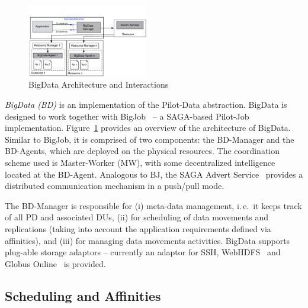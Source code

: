 \documentclass{acm_proc_article-sp}
\newcommand{\jhanote}[1]{ {\textcolor{red} { ***SJ: #1 }}}
\newcommand{\alnote}[1]{ {\textcolor{blue} { ***andreL: #1 }}}
\newcommand{\alnote}[1]{}
\newcommand{\jhanote}[1]{}
\newcommand{\upp}{\vspace*{-0.5em}}
\newcommand{\dus}{DUs\xspace}
\newcommand{\pd}{PD\xspace}
\begin{document}
\begin{figure}[htbp]
	\centering
		\includegraphics[width=0.47\textwidth]{figures/bigdata.pdf}
	\caption{BigData Architecture and Interactions\upp}
	\label{fig:figures_bigdata}
\end{figure}

{\it BigData (BD)} is an implementation of the Pilot-Data
abstraction. BigData is designed to work together with
BigJob~\cite{bigjob_web} -- a SAGA-based Pilot-Job implementation.
Figure~\ref{fig:figures_bigdata} provides an overview of the
architecture of BigData. Similar to BigJob, it is comprised of two
components: the BD-Manager and the BD-Agents, which are deployed on
the physical resources.  The coordination scheme used is Master-Worker
(MW), with some decentralized intelligence located at the BD-Agent.
Analogous to BJ, the SAGA Advert Service~\cite{saga_advert} 
provides a distributed communication mechanism in a push/pull mode.

The BD-Manager is responsible for (i) meta-data management, i.\,e.\ it
keeps track of all \pd and associated \dus, 
(ii) for scheduling of data movements and replications 
(taking into account the application requirements defined
via affinities), and (iii) for managing data movements activities. 
BigData supports plug-able storage adaptors -- currently an adaptor 
for SSH, WebHDFS~\cite{webhdfs} and Globus Online~\cite{10.1109/MIC.2011.64}
is provided. 


\upp
\subsection{Scheduling and Affinities}
\label{sec-affinities}
\end{document}
